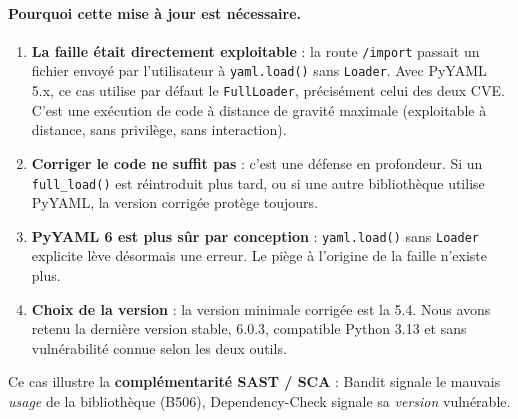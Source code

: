 \documentclass[11pt,a4paper]{article}
\newcommand{\code}[1]{\texttt{#1}}
\begin{document}
\paragraph{Pourquoi cette mise à jour est nécessaire.}
\begin{enumerate}[leftmargin=*]
  \item \textbf{La faille était directement exploitable} : la route \code{/import} passait un
        fichier envoyé par l'utilisateur à \code{yaml.load()} sans \code{Loader}. Avec PyYAML 5.x,
        ce cas utilise par défaut le \code{FullLoader}, précisément celui des deux CVE. C'est une
        exécution de code à distance de gravité maximale (exploitable à distance, sans privilège,
        sans interaction).
  \item \textbf{Corriger le code ne suffit pas} : c'est une défense en profondeur. Si un
        \code{full\_load()} est réintroduit plus tard, ou si une autre bibliothèque utilise
        PyYAML, la version corrigée protège toujours.
  \item \textbf{PyYAML 6 est plus sûr par conception} : \code{yaml.load()} sans \code{Loader}
        explicite lève désormais une erreur. Le piège à l'origine de la faille n'existe plus.
  \item \textbf{Choix de la version} : la version minimale corrigée est la 5.4. Nous avons retenu
        la dernière version stable, 6.0.3, compatible Python 3.13 et sans vulnérabilité connue
        selon les deux outils.
\end{enumerate}

\noindent Ce cas illustre la \textbf{complémentarité SAST / SCA} : Bandit signale le mauvais
\emph{usage} de la bibliothèque (B506), Dependency-Check signale sa \emph{version} vulnérable.
\end{document}
